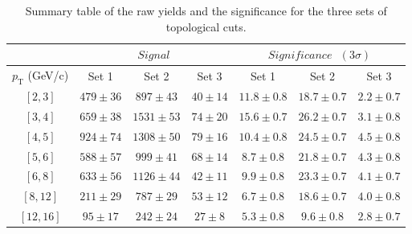 \documentclass[b5paper,10pt,twoside,oldstyle,classica]{toptesi}
\newcommand{\pt}{p_\text{T}}
\begin{document}
\begin{table}[b]
\centering 
\begin{center} %
\renewcommand\arraystretch{1.1} 
\fontsize{9}{11}\selectfont
\begin{tabular}{|c|c|c|c|c|c|c|}
\cline{2-7}
\multicolumn{1}{c|}{} & \multicolumn{3}{c|}{$Signal$} & \multicolumn{3}{c|}{$Significance\text{ }(3\sigma)$}\\
\hline
$\pt$ (GeV/c) & Set 1 & Set 2 & Set 3 & Set 1 & Set 2 & Set 3 \\
\hline
$[2,3]$ & $479\pm36$ & $897\pm43$ & $40\pm14$ & $11.8\pm0.8$ & $18.7\pm0.7$ & $2.2\pm0.7$ \\
$[3,4]$ & $659\pm38$ & $1531\pm53$ & $74\pm20$ & $15.6\pm0.7$ & $26.2\pm0.7$ & $3.1\pm0.8$ \\
$[4,5]$ & $924\pm74$ & $1308\pm50$ & $79\pm16$ & $10.4\pm0.8$ & $24.5\pm0.7$ & $4.5\pm0.8$ \\
$[5,6]$ & $588\pm57$ & $999\pm41$ & $68\pm14$ & $8.7\pm0.8$ & $21.8\pm0.7$ & $4.3\pm0.8$ \\
$[6,8]$ & $633\pm56$ & $1126\pm44$ & $42\pm11$ & $9.9\pm0.8$ & $23.3\pm0.7$ & $4.1\pm0.7$ \\
$[8,12]$ & $211\pm29$ & $787\pm29$ & $53\pm12$ & $6.7\pm0.8$ & $18.6\pm0.7$ & $4.0\pm0.8$ \\
$[12,16]$ & $95\pm17$ & $242\pm24$ & $27\pm8$ & $5.3\pm0.8$ & $9.6\pm0.8$ & $2.8\pm0.7$ \\
\hline
\end{tabular}
\caption{Summary table of the raw yields and the significance for the three sets of topological cuts.}
\label{raw_yields_cutvar}
\end{center} 
\end{table}
\end{document}
